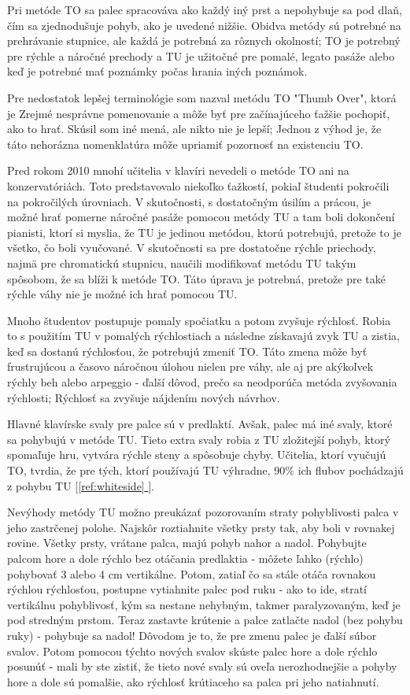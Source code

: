 \documentclass[11pt,a4paper]{book}
\newcommand*{\fullref}[1]{\hyperref[{#1}]{\ref*{#1} \nameref*{#1}}} %
\newcommand*{\fullrefp}[1]{[\fullref{#1}]} %
\begin{document}
Pri metóde TO sa palec spracováva ako každý iný prst a nepohybuje sa pod dlaň, čím sa zjednodušuje pohyb, ako je uvedené nižšie. Obidva metódy sú potrebné na prehrávanie stupnice, ale každá je potrebná za rôznych okolností; TO je potrebný pre rýchle a náročné prechody a TU je užitočné pre pomalé, legato pasáže alebo keď je potrebné mať poznámky počas hrania iných poznámok.

Pre nedostatok lepšej terminológie som nazval metódu TO "Thumb Over", ktorá je
Zrejmé nesprávne pomenovanie a môže byť pre začínajúceho ťažšie pochopiť, ako to hrať. Skúsil som iné mená, ale nikto nie je lepší; Jednou z výhod je, že táto nehorázna nomenklatúra môže upriamiť pozornosť na existenciu TO.

Pred rokom 2010 mnohí učitelia v klavíri nevedeli o metóde TO ani na konzervatóriách. Toto predstavovalo niekoľko ťažkostí, pokiaľ študenti pokročili na pokročilých úrovniach. V skutočnosti, s dostatočným úsilím a prácou, je možné hrať pomerne náročné pasáže pomocou metódy TU a tam boli dokončení pianisti, ktorí si myslia, že TU je jedinou metódou, ktorú potrebujú, pretože to je všetko, čo boli vyučované. V skutočnosti sa pre dostatočne rýchle priechody, najmä pre chromatickú stupnicu, naučili modifikovať metódu TU takým spôsobom, že sa blíži k metóde TO. Táto úprava je potrebná, pretože pre také rýchle váhy nie je možné ich hrať pomocou TU.

Mnoho študentov postupuje pomaly spočiatku a potom zvyšuje rýchlosť. Robia to s použitím TU v pomalých rýchlostiach a následne získavajú zvyk TU a zistia, keď sa dostanú rýchlosťou, že potrebujú zmeniť TO. Táto zmena môže byť frustrujúcou a časovo náročnou úlohou nielen pre váhy, ale aj pre akýkoľvek rýchly beh alebo arpeggio - ďalší dôvod, prečo sa neodporúča metóda zvyšovania rýchlosti; Rýchlosť sa zvyšuje nájdením nových návrhov.

Hlavné klavírske svaly pre palce sú v predlaktí. Avšak, palec má iné svaly, ktoré sa pohybujú v metóde TU. Tieto extra svaly robia z TU zložitejší pohyb, ktorý spomaľuje hru, vytvára rýchle steny a spôsobuje chyby. Učitelia, ktorí vyučujú TO, tvrdia, že pre tých, ktorí používajú TU výhradne, 90\% ich flubov pochádzajú z pohybu TU \fullrefp{ref:whiteside}.

Nevýhody metódy TU možno preukázať pozorovaním straty pohyblivosti palca v jeho zastrčenej polohe. Najskôr roztiahnite všetky prsty tak, aby boli v rovnakej rovine. Všetky prsty, vrátane palca, majú pohyb nahor a nadol. Pohybujte palcom hore a dole rýchlo bez otáčania predlaktia - môžete ľahko (rýchlo) pohybovať 3 alebo 4 cm vertikálne. Potom, zatiaľ čo sa stále otáča rovnakou rýchlou rýchlosťou, postupne vytiahnite palec pod ruku - ako to ide, stratí vertikálnu pohyblivosť, kým sa nestane nehybným, takmer paralyzovaným, keď je pod stredným prstom. Teraz zastavte krútenie a palce zatlačte nadol (bez pohybu ruky) - pohybuje sa nadol! Dôvodom je to, že pre zmenu palec je ďalší súbor svalov. Potom pomocou týchto nových svalov skúste palec hore a dole rýchlo posunúť - mali by ste zistiť, že tieto nové svaly sú oveľa nerozhodnejšie a pohyby hore a dole sú pomalšie, ako rýchlosť krútiaceho sa palca pri jeho natiahnutí.
\end{document}

